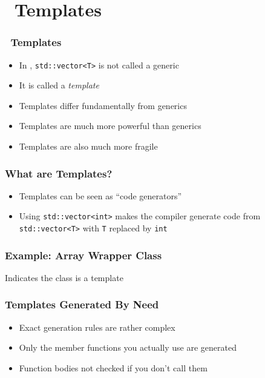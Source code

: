 \section{\cpp\ Templates}

\frame{\tableofcontents[currentsection]}

\begin{frame}
  \frametitle{\cpp\ Templates}
  \begin{itemize}
    \item In \cpp, \texttt{std::vector<T>} is not called a generic
    \item It is called a \emph{template}
    \item Templates differ fundamentally from generics
    \item Templates are much more powerful than generics
    \item Templates are also much more fragile
  \end{itemize}
\end{frame}

\begin{frame}
  \frametitle{What are Templates?}
  \begin{itemize}
    \item Templates can be seen as ``code generators''
    \item Using \texttt{std::vector<int>} makes the compiler generate
          code from \texttt{std::vector<T>} with \texttt{T} replaced by \texttt{int}
  \end{itemize}
\end{frame}

\begin{frame}
  \frametitle{Example: Array Wrapper Class}
  \vskip-10mm
  \begin{overprint}
    \begin{center}
      Indicates the class is a template
    \end{center}
  \end{overprint}
\end{frame}

\begin{frame}
  \frametitle{Templates Generated By Need}
  \begin{itemize}
    \item Exact generation rules are rather complex
    \item Only the member functions you actually use are generated
    \item Function bodies not checked if you don't call them
  \end{itemize}
  \begin{overprint}
  \end{overprint}
\end{frame}

